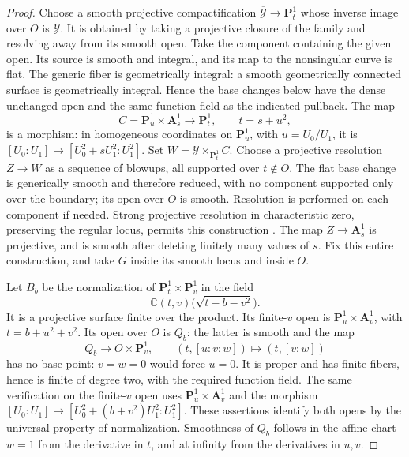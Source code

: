 \documentclass[11pt]{amsart}
\newcommand{\C}{\mathbb C}
\newcommand{\PP}{\mathbf P}
\renewcommand{\AA}{\mathbf A}
\theoremstyle{definition}
\theoremstyle{remark}
\numberwithin{equation}{section}
\begin{document}
\begin{proof}
Choose a smooth projective compactification
$\overline{\mathcal Y}\to\PP^1_t$ whose inverse image over $O$ is
$\mathcal Y$.  It is obtained by taking a projective closure of the
family and resolving away from its smooth open.  Take the component containing the given open. Its source is smooth and
integral, and its map to the nonsingular curve is flat. The generic fiber
is geometrically integral: a smooth geometrically connected surface is
geometrically integral. Hence the base changes below have the dense
unchanged open and the same function field as the indicated pullback.  The map
\[
 C=\PP^1_u\times\AA^1_s\longrightarrow\PP^1_t,
 \qquad t=s+u^2,
\]
is a morphism: in homogeneous coordinates on $\PP^1_u$, with $u=U_0/U_1$, it is
$[U_0:U_1]\mapsto[U_0^2+sU_1^2:U_1^2]$.
Set
$W=\overline{\mathcal Y}\times_{\PP^1_t}C$.  Choose a projective
resolution $Z\to W$ as a sequence of blowups, all supported over
$t\notin O$.  The flat base change is generically smooth and therefore
reduced, with no component supported only over the boundary; its open
over $O$ is smooth.  Resolution is performed on each component if needed.
Strong projective resolution in characteristic zero, preserving the
regular locus, permits this construction
\cite[Theorems~1.0.2--1.0.3]{Wlodarczyk}.
The map $Z\to\AA^1_s$ is projective,
and is smooth after deleting finitely many values of $s$.  Fix this entire
construction, and take $G$ inside its smooth locus and inside $O$.

Let $B_b$ be the normalization of $\PP^1_t\times\PP^1_v$ in the field
\[
 \C(t,v)\bigl(\sqrt{t-b-v^2}\bigr).
\]
It is a projective surface finite over the product.  Its finite-$v$ open
is $\PP^1_u\times\AA^1_v$, with $t=b+u^2+v^2$.  Its open over $O$ is
$Q_b$: the latter is smooth and the map
\[
 Q_b\longrightarrow O\times\PP^1_v,
 \qquad (t,[u:v:w])\longmapsto(t,[v:w])
\]
has no base point: $v=w=0$ would force $u=0$.
It is proper and has finite fibers, hence is finite of degree two, with
the required function field.  The same verification on the finite-$v$
open uses $\PP^1_u\times\AA^1_v$ and the morphism
$[U_0:U_1]\mapsto[U_0^2+(b+v^2)U_1^2:U_1^2]$.
These assertions identify both opens by the universal property
of normalization.  Smoothness of $Q_b$ follows in the affine chart $w=1$
from the derivative in $t$, and at infinity from the derivatives in
$u,v$.


\end{proof}
\end{document}
